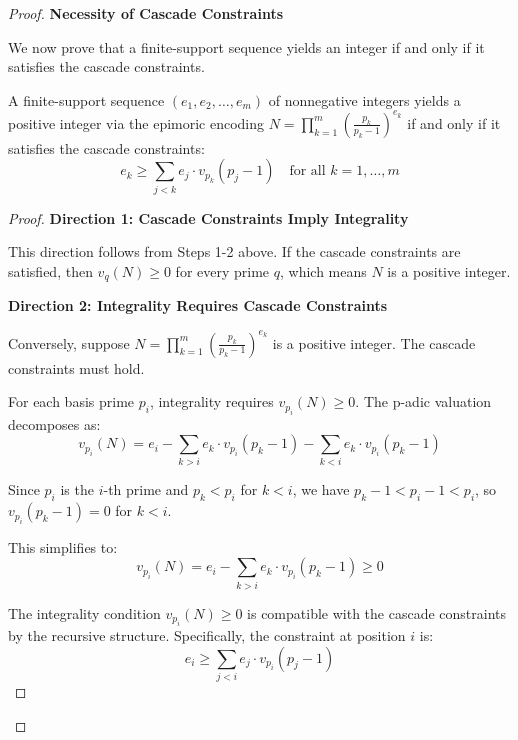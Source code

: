 \begin{proof}
\noindent \textbf{Necessity of Cascade Constraints}

We now prove that a finite-support sequence yields an integer if and only if it satisfies the cascade constraints.

\begin{lemma*}
A finite-support sequence $(e_1, e_2, \ldots, e_m)$ of nonnegative integers yields a positive integer via the epimoric encoding $N = \prod_{k=1}^m \left(\frac{p_k}{p_k - 1}\right)^{e_k}$ if and only if it satisfies the cascade constraints:
\begin{equation}
e_k \geq \sum_{j < k} e_j \cdot v_{p_k}(p_j - 1) \quad \text{for all } k = 1, \ldots, m
\end{equation}
\end{lemma*}

\begin{proof}

\noindent \textbf{Direction 1: Cascade Constraints Imply Integrality}

This direction follows from Steps 1-2 above. If the cascade constraints are satisfied, then $v_q(N) \geq 0$ for every prime $q$, which means $N$ is a positive integer.

\noindent \textbf{Direction 2: Integrality Requires Cascade Constraints}

Conversely, suppose $N = \prod_{k=1}^m \left(\frac{p_k}{p_k - 1}\right)^{e_k}$ is a positive integer. The cascade constraints must hold.

For each basis prime $p_i$, integrality requires $v_{p_i}(N) \geq 0$. The p-adic valuation decomposes as:
\begin{equation}
v_{p_i}(N) = e_i - \sum_{k > i} e_k \cdot v_{p_i}(p_k - 1) - \sum_{k < i} e_k \cdot v_{p_i}(p_k - 1)
\end{equation}

Since $p_i$ is the $i$-th prime and $p_k < p_i$ for $k < i$, we have $p_k - 1 < p_i - 1 < p_i$, so $v_{p_i}(p_k - 1) = 0$ for $k < i$.

This simplifies to:
\begin{equation}
v_{p_i}(N) = e_i - \sum_{k > i} e_k \cdot v_{p_i}(p_k - 1) \geq 0
\end{equation}

The integrality condition $v_{p_i}(N) \geq 0$ is compatible with the cascade constraints by the recursive structure. Specifically, the constraint at position $i$ is:
\begin{equation}
e_i \geq \sum_{j < i} e_j \cdot v_{p_i}(p_j - 1)
\end{equation}


\end{proof}
\end{proof}
